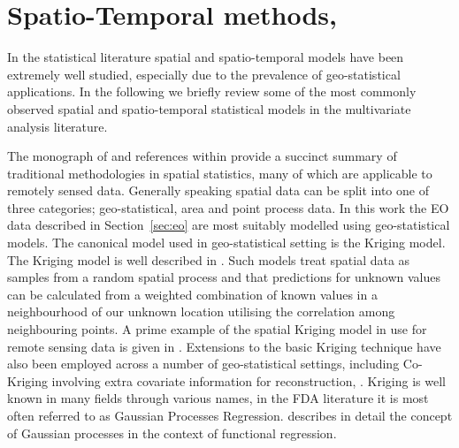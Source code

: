 \section{Spatio-Temporal methods, \label{sec:st_methods}}
In the statistical literature spatial and spatio-temporal models have been extremely well studied, especially due to the prevalence of geo-statistical applications.
In the following we briefly review some of the most commonly observed spatial and spatio-temporal statistical models in the multivariate analysis literature. 

The monograph of \cite{cressie_statistics_2010} and references within provide a succinct summary of traditional methodologies in spatial statistics, many of which are applicable to remotely sensed data.
Generally speaking spatial data can be split into one of three categories; geo-statistical, area and point process data.
In this work the EO data described in Section~\ref{sec:eo}  are most suitably modelled using geo-statistical models.
The canonical model used in geo-statistical setting is the Kriging model.
The Kriging model is well described in \cite{stein_interpolation_1999}.
Such models treat spatial data as samples from a random spatial process and that predictions for unknown values can be calculated from a weighted combination of known values in a neighbourhood of our unknown location utilising the correlation among neighbouring points.
A prime example of the spatial Kriging model in use for remote sensing data is given in \cite{rossi_kriging_1994}.
Extensions to the basic Kriging technique have also been employed across a number of geo-statistical settings, including Co-Kriging involving extra covariate information for reconstruction, \cite{zhang_restoration_2009}.
Kriging is well known in many fields through various names, in the FDA literature it is most often referred to as Gaussian Processes Regression.
\citeauthor{shi_gaussian_2011} describes in detail the concept of Gaussian processes in the context of functional regression. 

